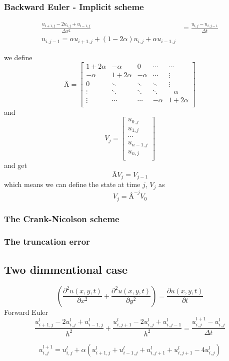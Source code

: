\documentclass[10pt,a4paper]{article}
\begin{document}
\subsubsection{Backward Euler - Implicit scheme}
\begin{align}
\frac{u_{i+1,j} - 2u_{i,j}+u_{i-1,j}}{\Delta x^2} &= \frac{u_{i,j} - u_{i,j-1}}{\Delta t} \\
u_{i,j-1} = \alpha u_{i+1,j} + (1 - 2\alpha )u_{i,j} + \alpha u_{i-1,j}
\end{align}

we define
\[
Â = \begin{bmatrix}
1+2\alpha & -\alpha & 0 & \cdots & \cdots \\
-\alpha & 1+2\alpha & -\alpha & \cdots & \vdots \\
0 & \ddots & \ddots & \ddots & \vdots \\
\vdots & \ddots & \ddots & \ddots & -\alpha \\
\vdots & \cdots & \cdots & -\alpha & 1+2\alpha \\
\end{bmatrix}
\]
and
\[ V_j = \begin{bmatrix}
u_{0,j}\\
u_{1,j}\\
\cdots\\
u_{n-1,j}\\
u_{n,j}\\
\end{bmatrix}
\]
and get
\begin{equation}
ÂV_j = V_{j-1}
\end{equation}
which means we can define the state at time $j$, $V_j$ as
\begin{equation}
V_j = Â^{-j}V_0
\end{equation}


\subsubsection{The Crank-Nicolson scheme}


\subsubsection{The truncation error}


\subsection{Two dimmentional case}
\begin{equation}
\left(\frac{\partial^2 u(x,y,t)}{\partial x^2} + \frac{\partial^2 u(x,y,t)}{\partial y^2}\right) = \frac{\partial u(x,y,t)}{\partial t}
\end{equation}
Forward Euler
\begin{equation}
\frac{u_{i+1,j}^l - 2u_{i,j}^l + u_{i-1,j}^l}{h^2} + \frac{u_{i,j+1}^l - 2u_{i,j}^l + u_{i,j-1}^l}{h^2} = \frac{u_{i,j}^{l+1} - u_{i,j}^l}{\Delta t}
\end{equation}

\begin{equation}
u_{i,j}^{l+1} = u_{i,j}^l + \alpha\left( u_{i+1,j}^l + u_{i-1,j}^l + u_{i,j+1}^l + u_{i,j+1}^l - 4u_{i,j}^l \right)
\end{equation}
\end{document}
